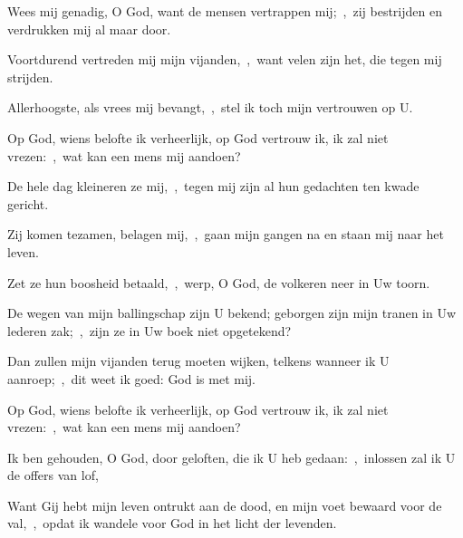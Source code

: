 \documentclass[12pt,twoside,a5paper]{article}
\begin{document}




\begin{halfparskip}
  Wees mij genadig, O God, want de mensen vertrappen mij;~\sep\ zij bestrijden en verdrukken mij al maar door.


  Voortdurend vertreden mij mijn vijanden,~\sep\ want velen zijn het, die tegen mij strijden.

  Allerhoogste, als vrees mij bevangt,~\sep\ stel ik toch mijn vertrouwen op U.

  Op God, wiens belofte ik verheerlijk, op God vertrouw ik, ik zal niet vrezen:~\sep\ wat kan een mens mij aandoen?

  De hele dag kleineren ze mij,~\sep\ tegen mij zijn al hun gedachten ten kwade gericht.

  Zij komen tezamen, belagen mij,~\sep\ gaan mijn gangen na en staan mij naar het leven.

  Zet ze hun boosheid betaald,~\sep\ werp, O God, de volkeren neer in Uw toorn.

  De wegen van mijn ballingschap zijn U bekend; geborgen zijn mijn tranen in Uw lederen zak;~\sep\ zijn ze in Uw boek niet opgetekend?

  Dan zullen mijn vijanden terug moeten wijken, telkens wanneer ik U aanroep;~\sep\ dit weet ik goed: God is met mij.

  Op God, wiens belofte ik verheerlijk, op God vertrouw ik, ik zal niet vrezen:~\sep\ wat kan een mens mij aandoen?
\end{halfparskip}


\begin{halfparskip}
  Ik ben gehouden, O God, door geloften, die ik U heb gedaan:~\sep\ inlossen zal ik U de offers van lof,

  Want Gij hebt mijn leven ontrukt aan de dood, en mijn voet bewaard voor de val,~\sep\ opdat ik wandele voor God in het licht der levenden.
\end{halfparskip}
\end{document}

